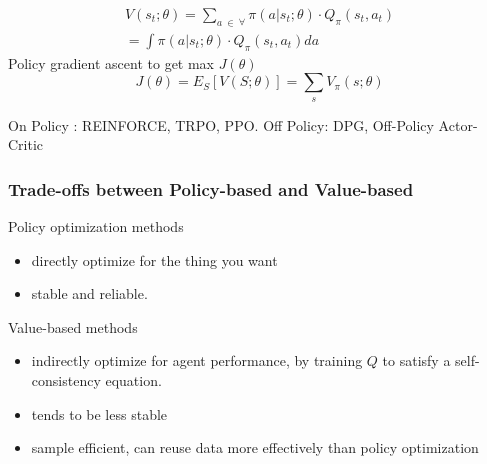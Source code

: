 \documentclass{article}
\begin{document}
\begin{CJK*}{UTF8}{gbsn}
\begin{align*}
V(s_{t};\theta) = \sum_{a \ \in \  \forall}\pi(a|s_{t};\theta)\cdot Q_{\pi}(s_{t},a_{t}) \\
= \int \pi(a|s_{t};\theta) \cdot Q_{\pi}(s_{t},a_{t}) da
\end{align*}
Policy gradient ascent to get max $J(\theta)$
$$J(\theta)=E_{S}[V(S;\theta)]=\sum_{s}V_{\pi}(s;\theta)$$

On Policy : REINFORCE, TRPO, PPO. 
Off Policy: DPG, Off-Policy Actor-Critic
\subsubsection{Trade-offs between Policy-based and Value-based}

Policy optimization methods
\begin{itemize}
\item  directly optimize for the thing you want
\item  stable and reliable. 
\end{itemize}


 
 Value-based methods 
 \begin{itemize}
 \item indirectly optimize for agent performance, by training $Q$ to satisfy a self-consistency equation. 
 \item tends to be less stable
 \item sample efficient, can reuse data more effectively than policy optimization
 \end{itemize}

 



\end{CJK*}
\end{document}
